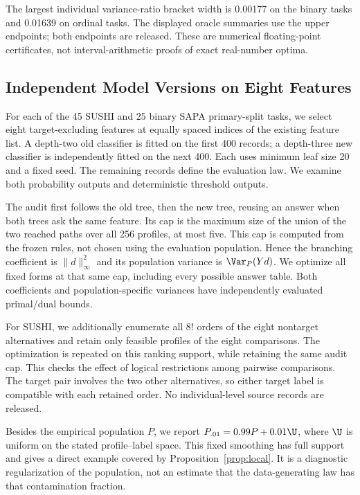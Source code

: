 The largest individual variance-ratio bracket width is 0.00177 on the
binary tasks and 0.01639 on ordinal tasks. The displayed oracle summaries
use the upper endpoints; both endpoints are released. These are numerical
floating-point certificates, not interval-arithmetic proofs of exact
real-number optima.

\subsection{Independent Model Versions on Eight Features}\label{app:medium}
For each of the 45 SUSHI and 25 binary SAPA primary-split tasks, we select
eight target-excluding features at equally spaced indices of the existing
feature list. A depth-two old classifier is fitted on the first 400 records;
a depth-three new classifier is independently fitted on the next 400.
Each uses minimum leaf size 20 and a fixed seed. The remaining records
define the evaluation law. We examine both probability outputs and
deterministic threshold outputs.

The audit first follows the old tree, then the new tree, reusing an answer
when both trees ask the same feature. Its cap is the maximum size of the
union of the two reached paths over all 256 profiles, at most five. This
cap is computed from the frozen rules, not chosen using the evaluation
population. Hence the branching coefficient is $\|d\|_\infty^2$ and its
population variance is $\Var_P(Yd)$. We optimize all fixed forms at that
same cap, including every possible answer table. Both coefficients and
population-specific variances have independently evaluated primal/dual
bounds.

For SUSHI, we additionally enumerate all $8!$ orders of the eight nontarget
alternatives and retain only feasible profiles of the eight comparisons.
The optimization is repeated on this ranking support, while retaining the
same audit cap. This checks the effect of logical restrictions among
pairwise comparisons. The target pair involves the two other alternatives,
so either target label is compatible with each retained order. No
individual-level source records are released.

Besides the empirical population $P$, we report
$P_{.01}=0.99P+0.01\U$, where $\U$ is uniform on the stated profile--label
space. This fixed smoothing has full support and gives a direct
example covered by Proposition~\ref{prop:local}. It is a diagnostic
regularization of the population, not an estimate that the data-generating
law has that contamination fraction.


